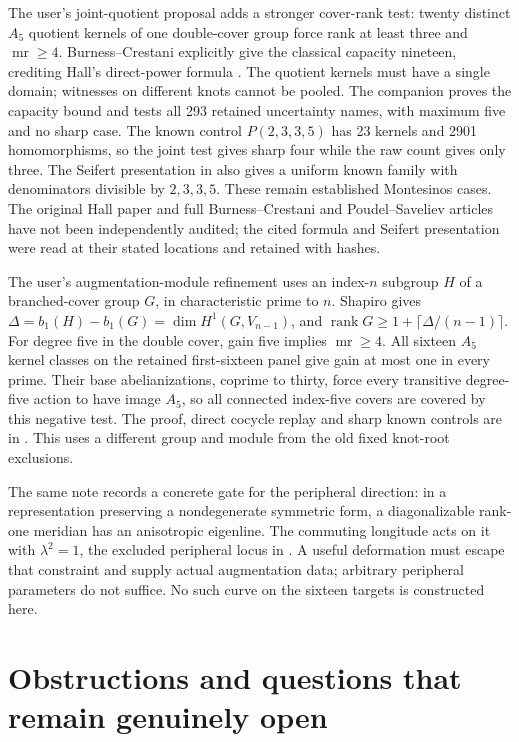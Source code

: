 \documentclass[11pt]{article}
\newcommand{\mr}{\operatorname{mr}}
\begin{document}
The user's joint-quotient proposal adds a stronger cover-rank test:
twenty distinct $A_5$ quotient kernels of one double-cover group
force rank at least three and $\mr\ge4$. Burness--Crestani explicitly
give the classical capacity nineteen, crediting Hall's direct-power
formula \cite[p.~2]{bc}. The quotient kernels must have a single
domain; witnesses on different knots cannot be pooled. The companion
 proves the capacity bound
and tests all 293 retained uncertainty names, with maximum five and
no sharp case. The known control $P(2,3,3,5)$ has 23 kernels and
2901 homomorphisms, so the joint test gives sharp four while the raw
count gives only three. The Seifert presentation in
\cite[Section 7.3]{ps} also gives a uniform known family with
denominators divisible by $2,3,3,5$. These remain established
Montesinos cases. The original Hall paper and full Burness--Crestani
and Poudel--Saveliev articles have not been independently audited;
the cited formula and Seifert presentation were read at their stated
locations and retained with hashes.

The user's augmentation-module refinement uses an index-$n$ subgroup
$H$ of a branched-cover group $G$, in characteristic prime to $n$.
Shapiro gives $\Delta=b_1(H)-b_1(G)=\dim H^1(G,V_{n-1})$, and
$\operatorname{rank}G\ge1+\lceil\Delta/(n-1)\rceil$. For degree five in the
double cover, gain five implies $\mr\ge4$. All sixteen $A_5$
kernel classes on the retained first-sixteen panel give gain at most
one in every prime. Their base abelianizations, coprime to thirty,
force every transitive degree-five action to have image $A_5$,
so all connected index-five covers are covered by this negative
test. The proof, direct cocycle replay and sharp known controls are
in . This uses a different
group and module from the old fixed knot-root exclusions.

The same note records a concrete gate for the peripheral direction:
in a representation preserving a nondegenerate symmetric form, a
diagonalizable rank-one meridian has an anisotropic eigenline.
The commuting longitude acts on it with $\lambda^2=1$, the excluded
peripheral locus in \cite[Section 2.3]{whitehead}. A useful deformation
must escape that constraint and supply actual augmentation data;
arbitrary peripheral parameters do not suffice. No such curve on
the sixteen targets is constructed here.

\section{Obstructions and questions that remain genuinely open}
\end{document}
